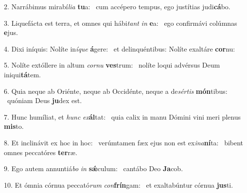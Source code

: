2. Narrábimus mirabí\textit{li}\textit{a} \textbf{tu}a: \ast\  cum accépero tempus, ego justítias judi\textbf{cá}bo.\

3. Liquefácta est terra, et omnes qui hábi\textit{tant} \textit{in} \textbf{e}a: \ast\  ego confirmávi colúmnas \textbf{e}jus.\

4. Dixi iníquis: Nolíte in\textit{í}\textit{que} \textbf{á}gere: \ast\  et delinquéntibus: Nolíte exaltáre \textbf{cor}nu:\

5. Nolíte extóllere in altum \textit{cor}\textit{nu} \textbf{ves}trum: \ast\  nolíte loqui advérsus Deum iniqui\textbf{tá}tem.\

6. Quia neque ab Oriénte, neque ab Occidénte, neque a de\textit{sér}\textit{tis} \textbf{món}tibus: \ast\  quóniam Deus \textbf{ju}dex est.\

7. Hunc humíliat, et \textit{hunc} \textit{ex}\textbf{ál}tat: \ast\  quia calix in manu Dómini vini meri plenus \textbf{mis}to.\

8. Et inclinávit ex hoc in hoc: \dag\  verúmtamen fæx ejus non est ex\textit{i}\textit{na}\textbf{ní}ta: \ast\  bibent omnes peccatóres \textbf{ter}ræ.\

9. Ego autem annuntiá\textit{bo} \textit{in} \textbf{sǽ}culum: \ast\  cantábo Deo \textbf{Ja}cob.\

10. Et ómnia córnua peccató\textit{rum} \textit{con}\textbf{frín}gam: \ast\  et exaltabúntur córnua \textbf{jus}ti.\

